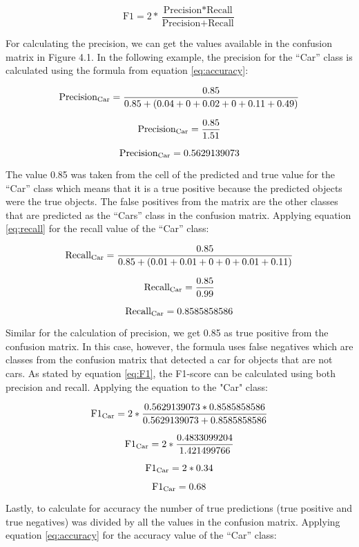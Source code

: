\begin{equation} \label{eq:F1}
{\text{F1}}= 2 * \frac{\text{Precision}*\text{Recall}}{\text{Precision}+\text{Recall}} 
\end{equation}


For calculating the precision, we can get the values available in the confusion matrix in Figure 4.1. In the following example, the precision for the “Car” class is calculated using the formula from equation \ref{eq:accuracy}:

\[{\text{Precision\textsubscript{Car}}}= \frac{0.85}{0.85+(0.04+0+0.02+0+0.11+0.49)} \]

\[{\text{Precision\textsubscript{Car}}}= \frac{0.85}{1.51} \]

\[{\text{Precision\textsubscript{Car}}}= 0.5629139073 \]

The value 0.85 was taken from the cell of the predicted and true value for the “Car” class which means that it is a true positive because the predicted objects were the true objects. The false positives from the matrix are the other classes that are predicted as the “Cars” class in the confusion matrix. Applying equation \ref{eq:recall} for the recall value of the “Car” class:


\[{\text{Recall\textsubscript{Car}}}= \frac{0.85}{0.85+(0.01+0.01+0+0+0.01+0.11)} \]

\[{\text{Recall\textsubscript{Car}}}= \frac{0.85}{0.99} \]

\[{\text{Recall\textsubscript{Car}}}= 0.8585858586 \]

Similar for the calculation of precision, we get 0.85 as true positive from the confusion matrix. In this case, however, the formula uses false negatives which are classes from the confusion matrix that detected a car for objects that are not cars. As stated by equation \ref{eq:F1}, the F1-score can be calculated using both precision and recall. Applying the equation to the "Car" class:

\[{\text{F1}\textsubscript{Car}}= 2 * \frac{0.5629139073*0.8585858586}{0.5629139073+0.8585858586} \]

\[{\text{F1}\textsubscript{Car}}= 2 * \frac{0.4833099204}{1.421499766} \]

\[{\text{F1}\textsubscript{Car}}= 2 * 0.34 \]

\[{\text{F1}\textsubscript{Car}}= 0.68 \]

Lastly, to calculate for accuracy the number of true predictions (true positive and true negatives) was divided by all the values in the confusion matrix. Applying equation \ref{eq:accuracy} for the accuracy value of the “Car” class:

